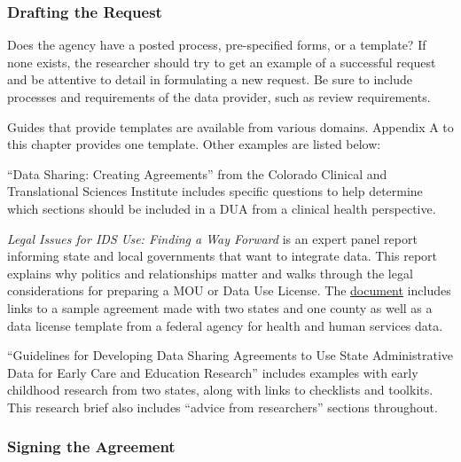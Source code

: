 \documentclass[
]{WileySix}
\begin{document}
\hypertarget{drafting-the-request}{%
\subsubsection{Drafting the Request}\label{drafting-the-request}}

Does the agency have a posted process, pre-specified forms, or a template? If none exists, the researcher should try to get an example of a successful request and be attentive to detail in formulating a new request. Be sure to include processes and requirements of the data provider, such as review requirements.

Guides that provide templates are available from various domains. Appendix A to this chapter provides one template. Other examples are listed below:

``Data Sharing: Creating Agreements'' \citep{jarquin2012} from the Colorado Clinical and Translational Sciences Institute includes specific questions to help determine which sections should be included in a DUA from a clinical health perspective.

\emph{Legal Issues for IDS Use: Finding a Way Forward} \citep{petrila2017} is an expert panel report informing state and local governments that want to integrate data. This report explains why politics and relationships matter and walks through the legal considerations for preparing a MOU or Data Use License. The \href{https://1slo241vnt3j2dn45s1y90db-wpengine.netdna-ssl.com/wp-content/uploads/2016/07/Legal-Issues.pdf}{document} includes links to a sample agreement made with two states and one county as well as a data license template from a federal agency for health and human services data.

``Guidelines for Developing Data Sharing Agreements to Use State Administrative Data for Early Care and Education Research'' \citep{shaw2018} includes examples with early childhood research from two states, along with links to checklists and toolkits. This research brief also includes ``advice from researchers'' sections throughout.

\hypertarget{signing-the-agreement}{%
\subsubsection{Signing the Agreement}\label{signing-the-agreement}}
\end{document}
